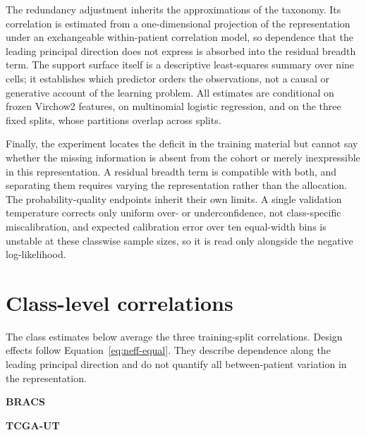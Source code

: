 \documentclass[11pt]{article}
\begin{document}
The redundancy adjustment inherits the approximations of the taxonomy. Its correlation is estimated from a one-dimensional projection of the representation under an exchangeable within-patient correlation model, so dependence that the leading principal direction does not express is absorbed into the residual breadth term. The support surface itself is a descriptive least-squares summary over nine cells; it establishes which predictor orders the observations, not a causal or generative account of the learning problem. All estimates are conditional on frozen Virchow2 features, on multinomial logistic regression, and on the three fixed splits, whose partitions overlap across splits.

Finally, the experiment locates the deficit in the training material but cannot say whether the missing information is absent from the cohort or merely inexpressible in this representation. A residual breadth term is compatible with both, and separating them requires varying the representation rather than the allocation. The probability-quality endpoints inherit their own limits. A single validation temperature corrects only uniform over- or underconfidence, not class-specific miscalibration, and expected calibration error over ten equal-width bins is unstable at these classwise sample sizes, so it is read only alongside the negative log-likelihood.


\clearpage
\appendix
\section{Class-level correlations}
The class estimates below average the three training-split correlations. Design effects follow Equation~\eqref{eq:neff-equal}. They describe dependence along the leading principal direction and do not quantify all between-patient variation in the representation.

\begin{table}[!htbp]
\centering\footnotesize
\setlength{\tabcolsep}{4pt}
\textbf{BRACS}\par\smallskip

\par\medskip
\textbf{TCGA-UT}\par\smallskip

\caption{Class-specific intraclass correlations and implied design effects at depths 8 and 32. Larger values indicate stronger projected within-patient dependence.}
\label{tab:class-iccs}
\end{table}
\clearpage
\end{document}
